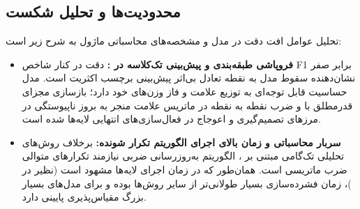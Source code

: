 \subsection{محدودیت‌ها و تحلیل شکست}
تحلیل عوامل افت دقت در مدل  و مشخصه‌های محاسباتی ماژول  به شرح زیر است:
\begin{itemize}
    \item \textbf{فروپاشی طبقه‌بندی و پیش‌بینی تک‌کلاسه در :} دقت  در کنار شاخص F1 برابر صفر نشان‌دهنده سقوط مدل به نقطه تعادل بی‌اثر پیش‌بینی برچسب اکثریت است. مدل  حساسیت قابل توجه‌ای به توزیع علامت و فاز وزن‌های خود دارد؛ بازسازی مجزای قدرمطلق با  و ضرب نقطه به نقطه در ماتریس علامت منجر به بروز ناپیوستگی در مرزهای تصمیم‌گیری و اعوجاج در فعال‌سازی‌های انتهایی لایه‌ها شده است.
    \item \textbf{سربار محاسباتی و زمان بالای اجرای الگوریتم تکرار شونده:} برخلاف روش‌های تحلیلی تک‌گامی مبتنی بر ، الگوریتم به‌روزرسانی ضربی  نیازمند تکرارهای متوالی ضرب ماتریسی است. همان‌طور که در زمان اجرای لایه‌ها مشهود است (نظیر  در )، زمان فشرده‌سازی بسیار طولانی‌تر از سایر روش‌ها بوده و برای مدل‌های بسیار بزرگ مقیاس‌پذیری پایینی دارد.
\end{itemize}
